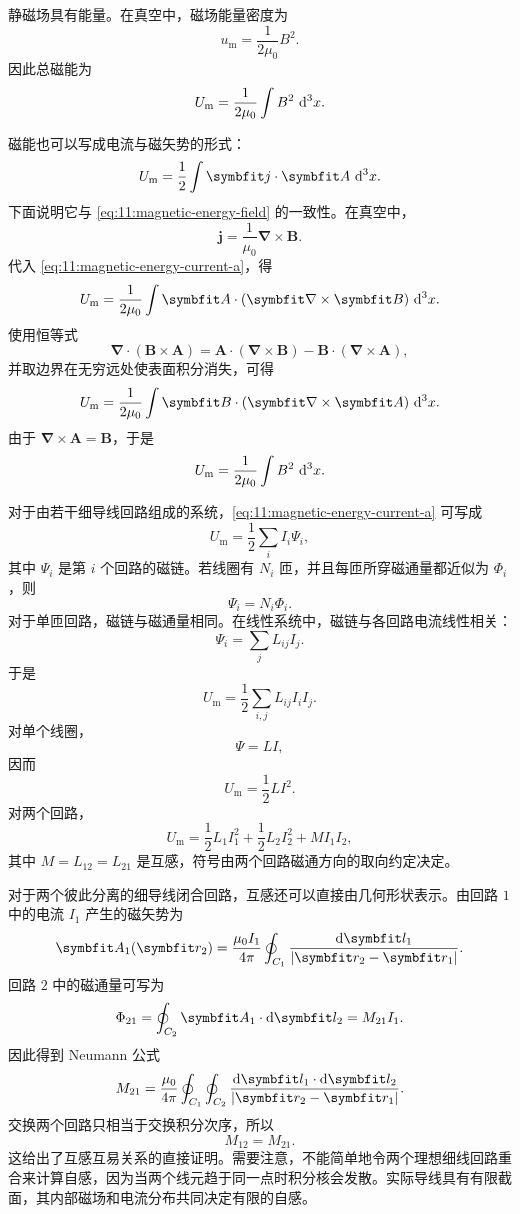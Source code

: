 静磁场具有能量。在真空中，磁场能量密度为
\[
u_{\mathrm{m}}
=
\frac{1}{2\mu_{0}}B^{2}.
\]
因此总磁能为
\begin{equation}
	U_{\mathrm{m}}
	=
	\frac{1}{2\mu_{0}}
	\int
	B^{2}\,\mathop{}\!\mathrm{d}^{3}x.
	\label{eq:11:magnetic-energy-field}
\end{equation}

磁能也可以写成电流与磁矢势的形式：
\begin{equation}
	U_{\mathrm{m}}
	=
	\frac{1}{2}
	\int
	\bm{j}\cdot\bm{A}
	\,\dif^{3}x.
	\label{eq:11:magnetic-energy-current-a}
\end{equation}
下面说明它与 \eqref{eq:11:magnetic-energy-field} 的一致性。在真空中，
\[
\bm{j}
=
\frac{1}{\mu_{0}}\bm{\nabla}\times\bm{B}.
\]
代入 \eqref{eq:11:magnetic-energy-current-a}，得
\[
U_{\mathrm{m}}
=
\frac{1}{2\mu_{0}}
\int
\bm{A}\cdot(\bm{\nabla}\times\bm{B})
\,\dif^{3}x.
\]
使用恒等式
\[
\bm{\nabla}\cdot(\bm{B}\times\bm{A})
=
\bm{A}\cdot(\bm{\nabla}\times\bm{B})
-
\bm{B}\cdot(\bm{\nabla}\times\bm{A}),
\]
并取边界在无穷远处使表面积分消失，可得
\[
U_{\mathrm{m}}
=
\frac{1}{2\mu_{0}}
\int
\bm{B}\cdot(\bm{\nabla}\times\bm{A})
\,\dif^{3}x.
\]
由于 $\bm{\nabla}\times\bm{A}=\bm{B}$，于是
\[
U_{\mathrm{m}}
=
\frac{1}{2\mu_{0}}
\int
B^{2}\,\mathop{}\!\mathrm{d}^{3}x.
\]

对于由若干细导线回路组成的系统，\eqref{eq:11:magnetic-energy-current-a} 可写成
\[
U_{\mathrm{m}}
=
\frac{1}{2}
\sum_{i}
I_{i}\Psi_{i},
\]
其中 $\Psi_{i}$ 是第 $i$ 个回路的磁链。若线圈有 $N_i$ 匝，并且每匝所穿磁通量都近似为 $\Phi_i$，则
\[
\Psi_i=N_i\Phi_i.
\]
对于单匝回路，磁链与磁通量相同。在线性系统中，磁链与各回路电流线性相关：
\[
\Psi_{i}
=
\sum_{j}L_{ij}I_{j}.
\]
于是
\[
U_{\mathrm{m}}
=
\frac{1}{2}
\sum_{i,j}
L_{ij}I_{i}I_{j}.
\]
对单个线圈，
\[
\Psi=LI,
\]
因而
\begin{equation}
	U_{\mathrm{m}}
	=
	\frac{1}{2}LI^{2}.
	\label{eq:11:self-inductance-energy}
\end{equation}
对两个回路，
\[
U_{\mathrm{m}}
=
\frac{1}{2}L_{1}I_{1}^{2}
+
\frac{1}{2}L_{2}I_{2}^{2}
+
MI_{1}I_{2},
\]
其中 $M=L_{12}=L_{21}$ 是互感，符号由两个回路磁通方向的取向约定决定。

对于两个彼此分离的细导线闭合回路，互感还可以直接由几何形状表示。由回路 $1$ 中的电流 $I_1$ 产生的磁矢势为
\[
\bm{A}_{1}(\bm{r}_{2})
=
\frac{\mu_{0}I_{1}}{4\pi}
\oint_{C_{1}}
\frac{\dif\bm{l}_{1}}{|\bm{r}_{2}-\bm{r}_{1}|}.
\]
回路 $2$ 中的磁通量可写为
\[
\Phi_{21}
=
\oint_{C_{2}}
\bm{A}_{1}\cdot\dif\bm{l}_{2}
=
M_{21}I_{1}.
\]
因此得到 Neumann 公式
\begin{equation}
	M_{21}
	=
	\frac{\mu_{0}}{4\pi}
	\oint_{C_{1}}
	\oint_{C_{2}}
	\frac{
		\dif\bm{l}_{1}\cdot\dif\bm{l}_{2}
	}{
		|\bm{r}_{2}-\bm{r}_{1}|
	}.
	\label{eq:11:neumann-mutual-inductance}
\end{equation}
交换两个回路只相当于交换积分次序，所以
\[
M_{12}=M_{21}.
\]
这给出了互感互易关系的直接证明。需要注意，不能简单地令两个理想细线回路重合来计算自感，因为当两个线元趋于同一点时积分核会发散。实际导线具有有限截面，其内部磁场和电流分布共同决定有限的自感。

